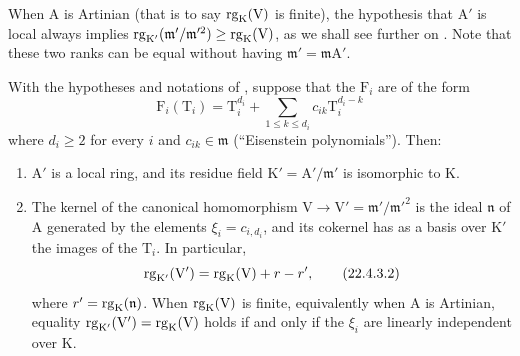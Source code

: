 \begin{remark}[22.4.2]
\label{0.22.4.2}
When $\mathrm{A}$ is Artinian (that is to say $\operatorname{rg}_\mathrm{K}(\mathrm{V})$ is finite), the hypothesis that $\mathrm{A}'$ is local always implies $\operatorname{rg}_{\mathrm{K}'}(\mathfrak{m}'/\mathfrak{m}'^2)\geq\operatorname{rg}_\mathrm{K}(\mathrm{V})$, as we shall see further on .
Note that these two ranks can be equal without having $\mathfrak{m}'=\mathfrak{m}\mathrm{A}'$.
\end{remark}

\begin{proposition}[22.4.3]
\label{0.22.4.3}
With the hypotheses and notations of , suppose that the $\mathrm{F}_i$ are of the form
\[
\label{0.22.4.3.1}
  \mathrm{F}_i(\mathrm{T}_i)=\mathrm{T}_i^{d_i}+\sum_{1\leq k\leq d_i}c_{ik}\mathrm{T}_i^{d_i-k}
  \tag{22.4.3.1}
\]
where $d_i\geq 2$ for every $i$ and $c_{ik}\in\mathfrak{m}$ (``Eisenstein polynomials'').
Then:
\begin{enumerate}
  \item[\rm{(i)}] $\mathrm{A}'$ is a local ring, and its residue field $\mathrm{K}'=\mathrm{A}'/\mathfrak{m}'$ is isomorphic to $\mathrm{K}$.


  \item[\rm{(ii)}] The kernel of the canonical homomorphism $\mathrm{V}\to\mathrm{V}'=\mathfrak{m}'/\mathfrak{m}'^2$ is the ideal $\mathfrak{n}$ of $\mathrm{A}$ generated by the elements $\xi_i=c_{i,d_i}$, and its cokernel has as a basis over $\mathrm{K}'$ the images of the $\mathrm{T}_i$.
  In particular,
  \begin{equation}
  \label{0.22.4.3.2}
    \operatorname{rg}_{\mathrm{K}'}(\mathrm{V}')=\operatorname{rg}_\mathrm{K}(\mathrm{V})+r-r',
    \tag{22.4.3.2}
  \end{equation}
  where $r'=\operatorname{rg}_\mathrm{K}(\mathfrak{n})$.
  When $\operatorname{rg}_\mathrm{K}(\mathrm{V})$ is finite, equivalently when $\mathrm{A}$ is Artinian, equality $\operatorname{rg}_{\mathrm{K}'}(\mathrm{V}')=\operatorname{rg}_\mathrm{K}(\mathrm{V})$ holds if and only if the $\xi_i$ are linearly independent over $\mathrm{K}$.
\end{enumerate}
\end{proposition}

